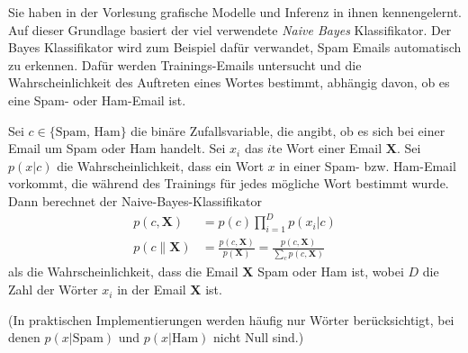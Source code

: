 

\renewcommand{\course}{Artificial Intelligence}
\renewcommand{\coursepicture}{course_ai}
\renewcommand{\coursedate}{Winter 2019}
\renewcommand{\exnum}{6}

\exercises
{}
\exercisestitle



Sie haben in der Vorlesung grafische Modelle und Inferenz in ihnen
kennengelernt. Auf dieser Grundlage basiert der viel verwendete \emph{Naive
Bayes} Klassifikator. Der Bayes Klassifikator wird zum Beispiel dafür verwandet,
Spam Emails automatisch zu erkennen. Dafür werden Trainings-Emails untersucht
und die Wahrscheinlichkeit des Auftreten eines Wortes bestimmt, abhängig davon, ob es eine Spam- oder Ham-Email ist.

Sei $c \in \{\text{Spam, Ham}\}$ die binäre Zufallsvariable, die angibt, ob es sich bei einer Email um Spam oder Ham handelt. Sei $x_i$ das $i$te Wort einer Email $\mathbf{X}$. Sei $p(x|c)$ die Wahrscheinlichkeit, dass ein Wort $x$ in einer Spam- bzw. Ham-Email vorkommt, die während des Trainings für jedes mögliche Wort bestimmt wurde. Dann berechnet der Naive-Bayes-Klassifikator
\begin{align*}
  p(c, \mathbf{X}) &= p(c) \prod_{i=1}^{D} p(x_i | c) \\
  p(c \| \mathbf{X}) &= \frac{p(c, \mathbf{X})}{p(\mathbf{X})}
  = \frac{p(c, \mathbf{X})}{\sum_c p(c,\mathbf{X})}
\end{align*}
als die Wahrscheinlichkeit, dass die Email $\mathbf{X}$ Spam oder Ham ist, wobei $D$ die Zahl der Wörter $x_i$ in der Email $\mathbf{X}$ ist.

(In praktischen Implementierungen werden häufig nur Wörter
berücksichtigt, bei denen $p(x|\text{Spam})$ und $p(x|\text{Ham})$
nicht Null sind.)



